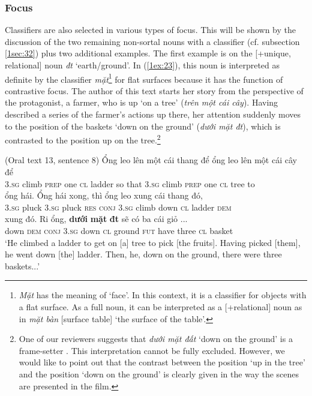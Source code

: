 \documentclass[output=paper]{langsci/langscibook}
\begin{document}
\subsubsection{Focus}\label{1sec:343}
Classifiers are also selected in various types of focus. This will be shown by the discussion of the two remaining non-sortal nouns with a classifier (cf. subsection \ref{1sec:32}) plus two additional examples. The first example is on the [+unique, \minus relational] noun {\emph{đ{\daa}t}} `earth/ground'. In (\ref{1ex:23}), this noun is interpreted as definite by the classifier {\emph{mặt}}\footnote{{\emph{Mặt}} has the meaning of `face'. In this context, it is a classifier for objects with a flat surface. As a full noun, it can be interpreted as a [+relational] noun as in {\emph{mặt bàn}} [surface table] `the surface of the table'.} for flat surfaces because it has the function of contrastive focus. The author of this text starts her story from the perspective of the protagonist, a farmer, who is up `on a tree' ({\emph{trên một cái cây}}). Having described a series of the farmer's actions up there, her attention suddenly moves to the position of the baskets `down on the ground' ({\emph{dưới mặt đ{\daa}t}}), which is contrasted to the position up on the tree.\footnote{One of our reviewers suggests that {\emph{dưới mặt đất}} `down on the ground' is a frame-setter \citep[e.\,g.,][]{krifka:08}. This interpretation cannot be fully excluded. However, we would like to point out that the contrast between the position `up in the tree' and the position `down on the ground' is clearly given in the way the scenes are presented in the film.}

\begin{exe}
\ex\label{1ex:23}
(Oral text 13, sentence 8)
\exi{}
\gll Ổng    leo      lên       một  cái  thang  để         ổng    leo    lên       một  cái cây  để \\
3.{\textsc{sg}}   climb {\textsc{prep}}   one  {\textsc{cl}} ladder  {so that}  3.{\textsc{sg}} climb {\textsc{prep}}  one  {\textsc{cl}} tree  to \\
\glt
\exi{}
\gll ổng    hái.    Ổng    hái    xong,  thì        ổng    leo      xu{\dao}ng  cái    thang   đó, \\
3.{\textsc{sg}} pluck  3.{\textsc{sg}}  pluck {\textsc{res}}   {\textsc{conj}}  3.{\textsc{sg}}  climb  down   {\textsc{cl}}   ladder   {\textsc{dem}}\\
\glt 
\exi{}
\gll xu{\dao}ng  đó.     R{\daob}i      ổng,    {\textbf{dưới}}   {\textbf{mặt}}  {\textbf{đ{\daa}t}}         sẽ     có       ba    cái   giỏ ...\\
down  {\textsc{dem}} {\textsc{conj}}  3.{\textsc{sg}}   down  {\textsc{cl}}   ground  {\textsc{fut}}  have  three {\textsc{cl}}   basket \\
\glt `He climbed a ladder to get on [a] tree to pick [the fruits]. Having picked [them], he went down [the] ladder. Then, he, down on the ground, there were three baskets...'
\end{exe}
\end{document}
